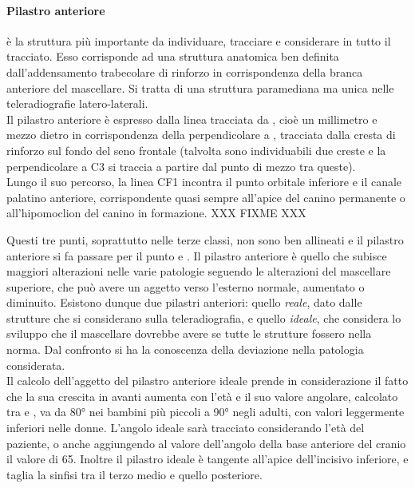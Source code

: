 \paragraph{Pilastro anteriore} è la struttura più importante da individuare, tracciare e considerare in tutto il tracciato. Esso corrisponde ad una struttura anatomica ben definita dall'addensamento trabecolare di rinforzo in corrispondenza della branca anteriore del mascellare. Si tratta di una struttura paramediana ma unica nelle teleradiografie latero-laterali.\\

Il pilastro anteriore è espresso dalla linea  tracciata da , cioè un millimetro e mezzo dietro  in corrispondenza della perpendicolare a , tracciata dalla cresta di rinforzo sul fondo del seno frontale (talvolta sono individuabili due creste e la perpendicolare a C3 si traccia a partire dal punto di mezzo tra queste).\\

Lungo il suo percorso, la linea CF1 incontra il punto orbitale inferiore e il canale palatino anteriore, corrispondente quasi sempre all'apice del canino permanente o all'hipomoclion del canino in formazione. XXX FIXME XXX

Questi tre punti, soprattutto nelle terze classi, non sono ben allineati e il pilastro anteriore si fa passare per il punto  e . Il pilastro anteriore è quello che subisce maggiori alterazioni nelle varie patologie seguendo le alterazioni del mascellare superiore, che può avere un aggetto verso l'esterno normale, aumentato o diminuito. Esistono dunque due pilastri anteriori: quello \emph{reale}, dato dalle strutture che si considerano sulla teleradiografia, e quello \emph{ideale}, che considera lo sviluppo che il mascellare dovrebbe avere se tutte le strutture fossero nella norma. Dal confronto si ha la conoscenza della deviazione nella patologia considerata.\\

Il calcolo dell'aggetto del pilastro anteriore ideale prende in considerazione il fatto che la sua crescita in avanti aumenta con l'età e il suo valore angolare, calcolato tra  e , va da 80° nei bambini più piccoli a 90° negli adulti, con valori leggermente inferiori nelle donne. L'angolo ideale sarà tracciato considerando l'età del paziente, o anche aggiungendo al valore dell'angolo della base anteriore del cranio il valore di 65. Inoltre il pilastro ideale è tangente all'apice dell'incisivo inferiore, e taglia la sinfisi tra il terzo medio e quello posteriore.\\

